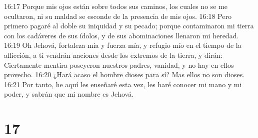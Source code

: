 16:17 Porque mis ojos están sobre todos sus caminos, los cuales no se me ocultaron, ni su maldad se esconde de la presencia de mis ojos.  
16:18 Pero primero pagaré al doble su iniquidad y su pecado; porque contaminaron mi tierra con los cadáveres de sus ídolos, y de sus abominaciones llenaron mi heredad.  
16:19 Oh Jehová, fortaleza mía y fuerza mía, y refugio mío en el tiempo de la aflicción, a ti vendrán naciones desde los extremos de la tierra, y dirán: Ciertamente mentira poseyeron nuestros padres, vanidad, y no hay en ellos provecho.  
16:20 ¿Hará acaso el hombre dioses para sí? Mas ellos no son dioses.  
16:21 Por tanto, he aquí les enseñaré esta vez, les haré conocer mi mano y mi poder, y sabrán que mi nombre es Jehová.  

\chapter{17}

